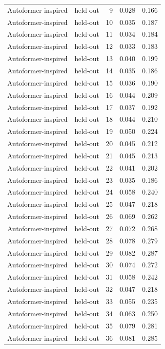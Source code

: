 \begin{tabular}{llrrr}
Autoformer-inspired & held-out & 9 & 0.028 & 0.166 \\
Autoformer-inspired & held-out & 10 & 0.035 & 0.187 \\
Autoformer-inspired & held-out & 11 & 0.034 & 0.184 \\
Autoformer-inspired & held-out & 12 & 0.033 & 0.183 \\
Autoformer-inspired & held-out & 13 & 0.040 & 0.199 \\
Autoformer-inspired & held-out & 14 & 0.035 & 0.186 \\
Autoformer-inspired & held-out & 15 & 0.036 & 0.190 \\
Autoformer-inspired & held-out & 16 & 0.044 & 0.209 \\
Autoformer-inspired & held-out & 17 & 0.037 & 0.192 \\
Autoformer-inspired & held-out & 18 & 0.044 & 0.210 \\
Autoformer-inspired & held-out & 19 & 0.050 & 0.224 \\
Autoformer-inspired & held-out & 20 & 0.045 & 0.212 \\
Autoformer-inspired & held-out & 21 & 0.045 & 0.213 \\
Autoformer-inspired & held-out & 22 & 0.041 & 0.202 \\
Autoformer-inspired & held-out & 23 & 0.035 & 0.186 \\
Autoformer-inspired & held-out & 24 & 0.058 & 0.240 \\
Autoformer-inspired & held-out & 25 & 0.047 & 0.218 \\
Autoformer-inspired & held-out & 26 & 0.069 & 0.262 \\
Autoformer-inspired & held-out & 27 & 0.072 & 0.268 \\
Autoformer-inspired & held-out & 28 & 0.078 & 0.279 \\
Autoformer-inspired & held-out & 29 & 0.082 & 0.287 \\
Autoformer-inspired & held-out & 30 & 0.074 & 0.272 \\
Autoformer-inspired & held-out & 31 & 0.058 & 0.242 \\
Autoformer-inspired & held-out & 32 & 0.047 & 0.218 \\
Autoformer-inspired & held-out & 33 & 0.055 & 0.235 \\
Autoformer-inspired & held-out & 34 & 0.063 & 0.250 \\
Autoformer-inspired & held-out & 35 & 0.079 & 0.281 \\
Autoformer-inspired & held-out & 36 & 0.081 & 0.285 \\

\end{tabular}
